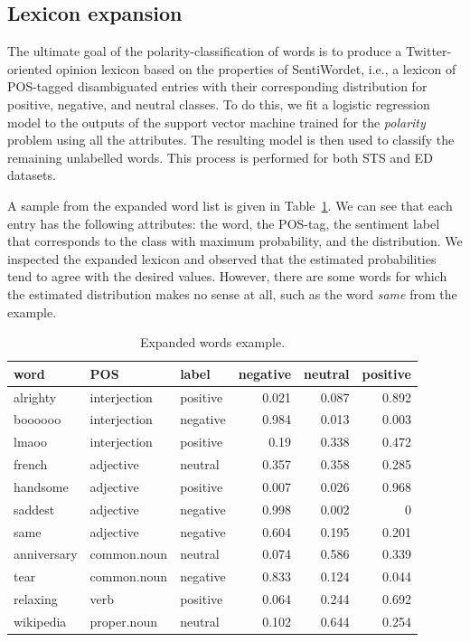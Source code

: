 \documentclass{sig-alternate}
\begin{document}
\subsection{Lexicon expansion}\label{sec:messlevel}
The ultimate goal of the polarity-classification of words is to produce a Twitter-oriented opinion lexicon based on the properties of SentiWordet, i.e., a lexicon of POS-tagged disambiguated entries with their corresponding distribution for positive, negative, and neutral classes.  To do this, we fit a logistic regression model to the outputs of the support vector machine trained for the \emph{polarity} problem using all the attributes. 
The resulting model is then used to classify the remaining unlabelled words. This process is performed for both STS and ED datasets.

A sample from the expanded word list is given in Table~\ref{tab:expwords}. We can see that each entry has the following attributes: the word, the POS-tag, the sentiment label that corresponds to the class with maximum probability, and the distribution. We inspected the expanded lexicon and observed that the estimated probabilities tend to agree with the desired values. However, there are some words for which the estimated distribution makes no sense at all, such as the word \emph{same} from the example.


\begin{table}[htbp]
\scriptsize
\begin{tabular}{l|l|l|r|r|r}
\hline
word & POS & label & negative & neutral& positive \\ \hline
alrighty & interjection & positive & 0.021 & 0.087 & 0.892 \\ 
boooooo & interjection & negative & 0.984 & 0.013 & 0.003 \\ 
lmaoo & interjection & positive & 0.19 & 0.338 & 0.472 \\ 
french & adjective & neutral & 0.357 & 0.358 & 0.285 \\ 
handsome & adjective & positive & 0.007 & 0.026 & 0.968 \\ 
saddest & adjective & negative & 0.998 & 0.002 & 0 \\ 
same & adjective & negative & 0.604 & 0.195 & 0.201 \\ 
anniversary & common.noun & neutral & 0.074 & 0.586 & 0.339 \\ 
tear & common.noun & negative & 0.833 & 0.124 & 0.044 \\ 
relaxing & verb & positive & 0.064 & 0.244 & 0.692 \\ 
wikipedia & proper.noun & neutral & 0.102 & 0.644 & 0.254 \\ \hline
\end{tabular}
\caption{Expanded words example.}
\label{tab:expwords}
\end{table}
\end{document}
